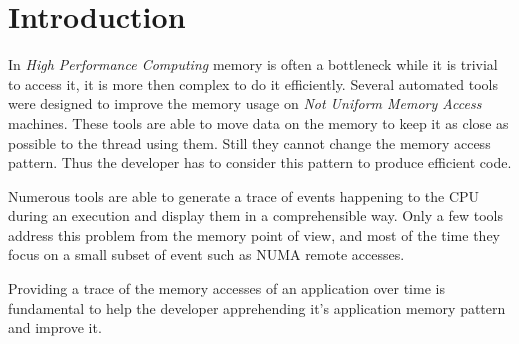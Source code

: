 \section{Introduction}
\label{sec:intro}


In \emph{High Performance Computing} memory is often a bottleneck while it is
trivial to access it, it is more then complex to do it efficiently. Several
automated tools were designed to improve the memory usage on \emph{Not Uniform
Memory Access} machines. These tools are able to move data on the memory to
keep it as close as possible to the thread using them. Still they cannot
change the memory access pattern. Thus the developer has to consider this
pattern to produce efficient code.

Numerous tools are able to generate a trace of events happening to the
CPU during an execution and display them in a comprehensible way. Only a few
tools address this problem from the memory point of view, and most of the time
they focus on a small subset of event such as NUMA remote accesses.

Providing a trace of the memory accesses of an application over time is
fundamental to help the developer apprehending it's application memory pattern
and improve it.

{}


